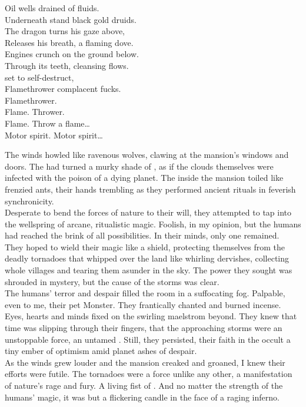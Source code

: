 Oil wells drained of fluids. \\
Underneath stand black gold druids. \\
The dragon turns his gaze above, \\
Releases his breath, a flaming dove. \\
Engines crunch on the ground below. \\
Through its teeth, cleansing  flows. \\
 set to self-destruct, \\
Flamethrower complacent fucks. \\

Flamethrower. \\
Flame. Thrower. \\
Flame. Throw a flame… \\

Motor spirit. Motor spirit… \\




The winds howled like ravenous wolves, clawing at the mansion's windows and doors. The  had turned a murky shade of , as if the clouds themselves were infected with the poison of a dying planet. The  inside the mansion toiled like frenzied ants, their hands trembling as they performed ancient rituals in feverish synchronicity. \\
Desperate to bend the forces of nature to their will, they attempted to tap into the wellspring of arcane, ritualistic magic. Foolish, in my opinion, but the humans had reached the brink of all possibilities. In their minds, only one remained. \\
They hoped to wield their magic like a shield, protecting themselves from the deadly tornadoes that whipped over the land like whirling dervishes, collecting whole villages and tearing them asunder in the sky. The power they sought was shrouded in mystery, but the cause of the storms was clear. \\

The humans' terror and despair filled the room in a suffocating fog. Palpable, even to me, their pet  Monster. They frantically chanted and burned incense. Eyes, hearts and minds fixed on the swirling maelstrom beyond. They knew that time was slipping through their fingers, that the approaching storms were an unstoppable force, an untamed . Still, they persisted, their faith in the occult a tiny ember of optimism amid planet  ashes of despair. \\
As the winds grew louder and the mansion creaked and groaned, I knew their efforts were futile. The tornadoes were a force unlike any other, a manifestation of nature's rage and fury. A living fist of . And no matter the strength of the humans' magic, it was but a flickering candle in the face of a raging inferno. \\

